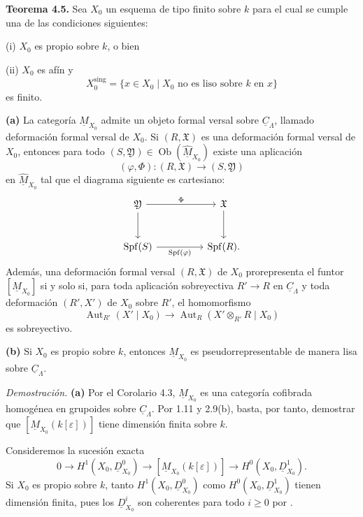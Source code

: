 
\medskip
\noindent\textbf{Teorema 4.5.}
Sea $X_0$ un esquema de tipo finito sobre $k$ para el cual se cumple
una de las condiciones siguientes:

\smallskip
\noindent(i) $X_0$ es propio sobre $k$, o bien

\noindent(ii) $X_0$ es afín y
\[
X_0^{\mathrm{sing}}
=\{x\in X_0\mid X_0\text{ no es liso sobre }k\text{ en }x\}
\]
es finito.

\smallskip
\noindent\textbf{(a)}
La categoría $\underline M_{X_0}$ admite un objeto formal versal
sobre $\underline C_\Lambda$, llamado deformación formal versal de
$X_0$. Si $(R,\mathfrak X)$ es una deformación formal versal de
$X_0$, entonces para todo
$(S,\mathfrak Y)\in\operatorname{Ob}(\widehat{\underline M}_{X_0})$
existe una aplicación
\[
(\varphi,\Phi):(R,\mathfrak X)\longrightarrow(S,\mathfrak Y)
\]
en $\widehat{\underline M}_{X_0}$ tal que el diagrama siguiente es
cartesiano:
\[
\begin{tikzcd}[column sep=huge,row sep=large]
\mathfrak Y \arrow[r,"\Phi"] \arrow[d]
& \mathfrak X \arrow[d] \\
\operatorname{Spf}(S)
 \arrow[r,"\operatorname{Spf}(\varphi)"']
& \operatorname{Spf}(R).
\end{tikzcd}
\]
Además, una deformación formal versal $(R,\mathfrak X)$ de $X_0$
prorepresenta el funtor $[\underline M_{X_0}]$ si y solo si, para toda
aplicación sobreyectiva $R'\longrightarrow R$ en
$\underline C_\Lambda$ y toda deformación $(R',X')$ de $X_0$ sobre
$R'$, el homomorfismo
\[
\operatorname{Aut}_{R'}(X'\mid X_0)
\longrightarrow
\operatorname{Aut}_R(X'\otimes_{R'}R\mid X_0)
\]
es sobreyectivo.

\smallskip
\noindent\textbf{(b)}
Si $X_0$ es propio sobre $k$, entonces $\underline M_{X_0}$ es
pseudorrepresentable de manera lisa sobre $\underline C_\Lambda$.


\medskip
\noindent\textit{Demostración.}
\textbf{(a)} Por el Corolario 4.3, $\underline M_{X_0}$ es una
categoría cofibrada homogénea en grupoides sobre
$\underline C_\Lambda$. Por 1.11 y 2.9(b), basta, por tanto, demostrar
que $[\underline M_{X_0}(k[\varepsilon])]$ tiene dimensión finita
sobre $k$.

Consideremos la sucesión exacta
\begin{equation}\tag{*}
0\longrightarrow H^1(X_0,\underline D^0_{X_0})
\longrightarrow[\underline M_{X_0}(k[\varepsilon])]
\longrightarrow H^0(X_0,\underline D^1_{X_0}).
\end{equation}
Si $X_0$ es propio sobre $k$, tanto
$H^1(X_0,\underline D^0_{X_0})$ como
$H^0(X_0,\underline D^1_{X_0})$ tienen dimensión finita, pues los
$\underline D^i_{X_0}$ son coherentes para todo $i\geq0$ por
.


